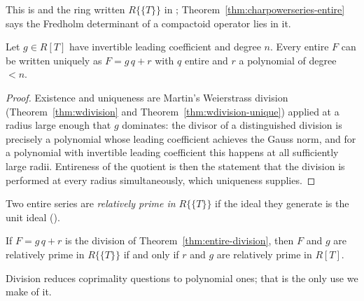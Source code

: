 This is \cite[Definition II.1.16]{Bellaiche} and the ring written $R\{\{T\}\}$ in
\cite[\S2.1]{JN}; Theorem~\ref{thm:charpowerseries-entire} says the Fredholm determinant of a
compactoid operator lies in it.

\begin{theorem}
  \label{thm:entire-division}
  \leanok
  Let $g \in R[T]$ have invertible leading coefficient and degree $n$.  Every entire $F$ can be
  written uniquely as $F = g\,q + r$ with $q$ entire and $r$ a polynomial of degree $< n$.
\end{theorem}

\begin{proof}
  \leanok
  Existence and uniqueness are Martin's Weierstrass division (Theorem~\ref{thm:wdivision} and
  Theorem~\ref{thm:wdivision-unique}) applied at a radius large enough that $g$ dominates: the
  divisor of a distinguished division is precisely a polynomial whose leading coefficient
  achieves the Gauss norm, and for a polynomial with invertible leading coefficient this happens
  at all sufficiently large radii.  Entireness of the quotient is then the statement that the
  division is performed at every radius simultaneously, which uniqueness supplies.
\end{proof}

\begin{definition}
  \label{def:isentirecoprime}
  \leanok
  Two entire series are \emph{relatively prime in $R\{\{T\}\}$} if the ideal they generate is
  the unit ideal (\cite[Definition 2.2.1]{JN}).
\end{definition}

\begin{lemma}
  \label{lem:coprime-remainder}
  \leanok
  If $F = g\,q + r$ is the division of Theorem~\ref{thm:entire-division}, then $F$ and $g$ are
  relatively prime in $R\{\{T\}\}$ if and only if $r$ and $g$ are relatively prime in $R[T]$.
\end{lemma}

Division reduces coprimality questions to polynomial ones; that is the only use we make of it.

